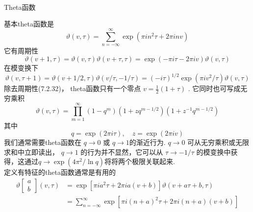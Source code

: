 \centerline{\Large Theta函数}
基本theta函数是
\begin{equation}
	\vartheta(v, \tau)=\sum_{n=-\infty}^{\infty} \exp \left(\pi i n^{2} \tau+2 \pi i n v\right)
\end{equation}
它有周期性
\begin{subequations}
\begin{equation}
\vartheta(v+1, \tau)=\vartheta(v, \tau) 
\end{equation}
\begin{equation}
\vartheta(v+\tau, \tau)=\exp (-\pi i \tau-2 \pi i v) \vartheta(v, \tau)
\end{equation}
\end{subequations}
在模变换下
\begin{subequations}
\begin{equation}
\vartheta(v, \tau+1) =\vartheta(v+1 / 2, \tau)
\end{equation}
\begin{equation}
\vartheta(v / \tau,-1 / \tau) =(-i \tau)^{1 / 2} \exp \left(\pi i v^{2} / \tau\right) \vartheta(v, \tau)
\end{equation}
\end{subequations}
除去周期性(7.2.32)， theta函数只有一个零点 $v=\frac{1}{2}(1+\tau) $ . 它同时也可写成无穷乘积
\begin{equation}
	\vartheta(v, \tau)=\prod_{m=1}^{\infty}\left(1-q^{m}\right)\left(1+z q^{m-1 / 2}\right)\left(1+z^{-1} q^{m-1 / 2}\right)
\end{equation}
其中
\begin{equation}
	q=\exp (2 \pi i \tau), \quad z=\exp (2 \pi i v)
\end{equation}
我们通常需要theta函数在 $q \rightarrow 0$ 或 $q \rightarrow 1$的渐近行为.  $q \rightarrow 0$ 可从无穷乘积或无限求和中立即读出， $q \rightarrow 1$ 的行为并不显然，它可以从 $\tau \rightarrow-1 / \tau$ 的模变换中获得，这通过$q \rightarrow \exp \left(4 \pi^{2} / \ln q\right)$将将两个极限关联起来.\\
定义有特征的theta函数通常是有用的
\begin{equation}
	\begin{aligned}
		\vartheta\left[\begin{array}{c}
			a \\
			b
		\end{array}\right](v, \tau) &=\exp \left[\pi i a^{2} \tau+2 \pi i a(v+b)\right] \vartheta(v+a \tau+b, \tau) \\
		&=\sum_{n=-\infty}^{\infty} \exp \left[\pi i(n+a)^{2} \tau+2 \pi i(n+a)(v+b)\right]
	\end{aligned}
\end{equation}
